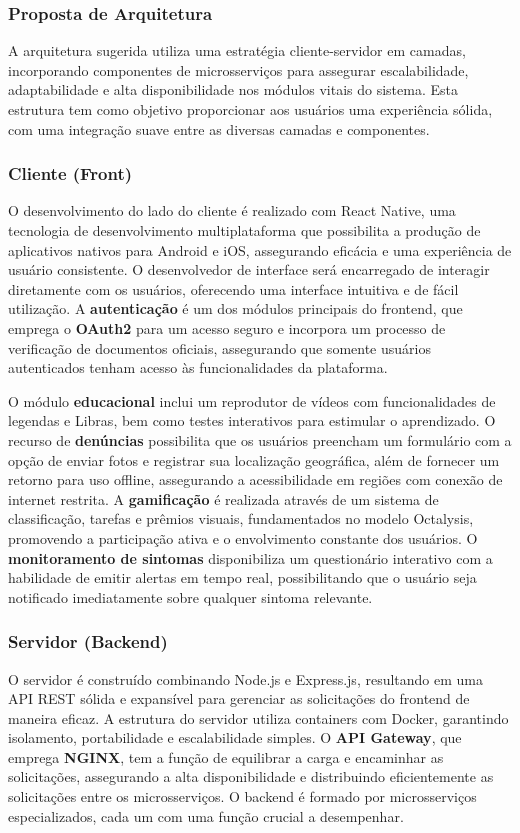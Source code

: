 \documentclass[a4paper, 12pt]{article}
\begin{document}
\subsubsection{Proposta de Arquitetura}

A arquitetura sugerida utiliza uma estratégia cliente-servidor em camadas, incorporando componentes de microsserviços para assegurar escalabilidade, adaptabilidade e alta disponibilidade nos módulos vitais do sistema. Esta estrutura tem como objetivo proporcionar aos usuários uma experiência sólida, com uma integração suave entre as diversas camadas e componentes.

\subsubsection{Cliente (Front)}
 
 O desenvolvimento do lado do cliente é realizado com React Native, uma tecnologia de desenvolvimento multiplataforma que possibilita a produção de aplicativos nativos para Android e iOS, assegurando eficácia e uma experiência de usuário consistente.  O desenvolvedor de interface será encarregado de interagir diretamente com os usuários, oferecendo uma interface intuitiva e de fácil utilização.  A \textbf{autenticação} é um dos módulos principais do frontend, que emprega o \textbf{OAuth2} para um acesso seguro e incorpora um processo de verificação de documentos oficiais, assegurando que somente usuários autenticados tenham acesso às funcionalidades da plataforma.
 
O módulo \textbf{educacional} inclui um reprodutor de vídeos com funcionalidades de legendas e Libras, bem como testes interativos para estimular o aprendizado.  O recurso de \textbf{denúncias} possibilita que os usuários preencham um formulário com a opção de enviar fotos e registrar sua localização geográfica, além de fornecer um retorno para uso offline, assegurando a acessibilidade em regiões com conexão de internet restrita.  A \textbf{gamificação} é realizada através de um sistema de classificação, tarefas e prêmios visuais, fundamentados no modelo Octalysis, promovendo a participação ativa e o envolvimento constante dos usuários.  O \textbf{monitoramento de sintomas} disponibiliza um questionário interativo com a habilidade de emitir alertas em tempo real, possibilitando que o usuário seja notificado imediatamente sobre qualquer sintoma relevante.

\subsubsection{Servidor (Backend)}
 O servidor é construído combinando Node.js e Express.js, resultando em uma API REST sólida e expansível para gerenciar as solicitações do frontend de maneira eficaz.  A estrutura do servidor utiliza containers com Docker, garantindo isolamento, portabilidade e escalabilidade simples.  O \textbf{API Gateway}, que emprega \textbf{NGINX}, tem a função de equilibrar a carga e encaminhar as solicitações, assegurando a alta disponibilidade e distribuindo eficientemente as solicitações entre os microsserviços.  O backend é formado por microsserviços especializados, cada um com uma função crucial a desempenhar.
 
\end{document}

